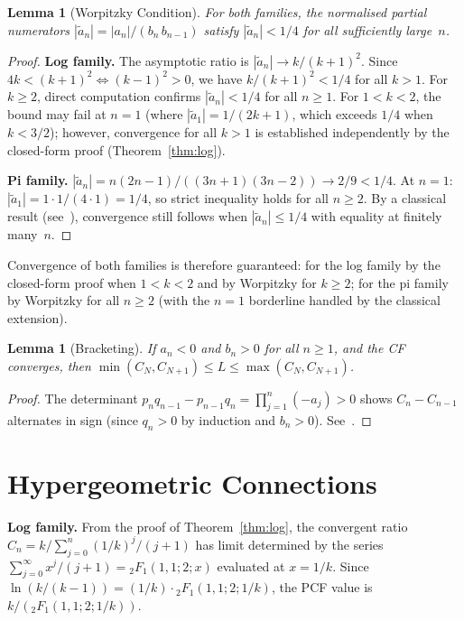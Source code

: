 \documentclass[11pt,a4paper]{article}
\theoremstyle{plain}
\newtheorem{lemma}[theorem]{Lemma}
\theoremstyle{remark}
\begin{document}
\begin{lemma}[Worpitzky Condition]\label{lem:work}
For both families, the normalised partial numerators
$|\tilde a_n| = |a_n|/(b_n\,b_{n-1})$ satisfy
$|\tilde a_n| < 1/4$ for all sufficiently large~$n$.
\end{lemma}
\begin{proof}
\textbf{Log family.}
The asymptotic ratio is $|\tilde a_n| \to k/(k{+}1)^2$.
Since $4k < (k{+}1)^2 \iff (k{-}1)^2 > 0$, we have
$k/(k{+}1)^2 < 1/4$ for all $k > 1$.
For $k \ge 2$, direct computation confirms $|\tilde a_n| < 1/4$
for all $n \ge 1$.
For $1 < k < 2$, the bound may fail at $n = 1$
(where $|\tilde a_1| = 1/(2k{+}1)$, which exceeds $1/4$
when $k < 3/2$); however, convergence for all $k > 1$ is
established independently by the closed-form proof
(Theorem~\ref{thm:log}).

\textbf{Pi family.}
$|\tilde a_n| = n(2n{-}1)/((3n{+}1)(3n{-}2)) \to 2/9 < 1/4$.
At $n = 1$: $|\tilde a_1| = 1\cdot1/(4\cdot1) = 1/4$, so strict inequality holds
for all $n \ge 2$.  By a classical result
(see~\cite[\S4.2]{lorentzen2008}), convergence still follows
when $|\tilde a_n| \le 1/4$ with equality at finitely many~$n$.
\end{proof}

\noindent Convergence of both families is therefore guaranteed:
for the log family by the closed-form proof when $1 < k < 2$ and
by Worpitzky for $k \ge 2$; for the pi family by Worpitzky
for all $n \ge 2$ (with the $n=1$ borderline handled by the
classical extension).

\begin{lemma}[Bracketing]\label{lem:bracket}
If $a_n < 0$ and $b_n > 0$ for all $n \ge 1$, and the CF converges,
then $\min(C_N,C_{N+1}) \le L \le \max(C_N,C_{N+1})$.
\end{lemma}
\begin{proof}
The determinant $p_nq_{n-1}-p_{n-1}q_n = \prod_{j=1}^n(-a_j)>0$
shows $C_n-C_{n-1}$ alternates in sign
(since $q_n>0$ by induction and $b_n>0$).
See~\cite[Theorem~4.35]{lorentzen2008}.
\end{proof}

\section{Hypergeometric Connections}\label{sec:hyper}

\textbf{Log family.}
From the proof of Theorem~\ref{thm:log}, the convergent ratio
$C_n = k/\sum_{j=0}^n (1/k)^j/(j{+}1)$ has limit determined by
the series $\sum_{j=0}^\infty x^j/(j{+}1) = {}_2F_1(1,1;2;x)$
evaluated at $x = 1/k$.  Since
$\ln(k/(k{-}1)) = (1/k)\cdot{}_2F_1(1,1;2;1/k)$, the PCF value
is $k/({}_2F_1(1,1;2;1/k))$.
\end{document}

